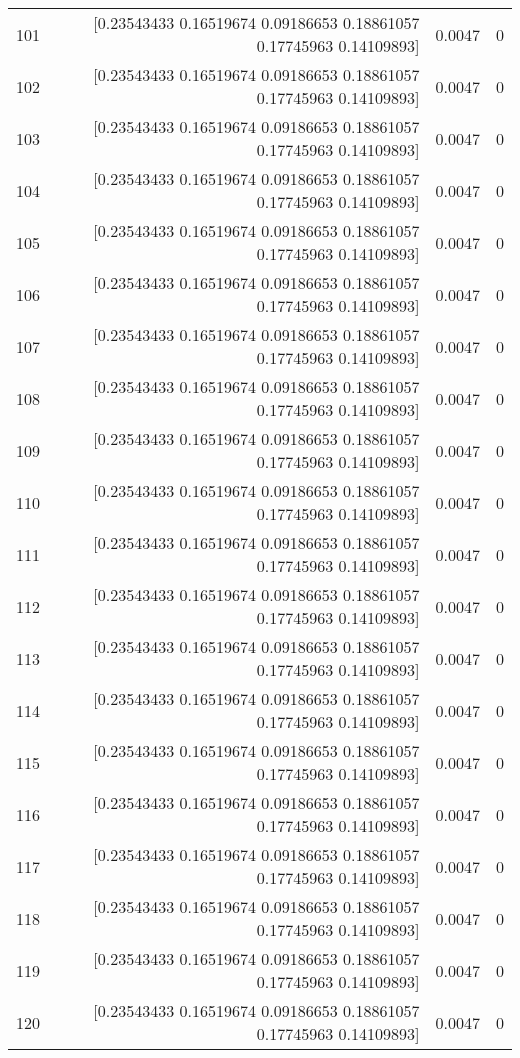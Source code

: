 \begin{longtable}{lrrr}
101 & [0.23543433 0.16519674 0.09186653 0.18861057 0.17745963 0.14109893] & 0.0047 & 0 \\
102 & [0.23543433 0.16519674 0.09186653 0.18861057 0.17745963 0.14109893] & 0.0047 & 0 \\
103 & [0.23543433 0.16519674 0.09186653 0.18861057 0.17745963 0.14109893] & 0.0047 & 0 \\
104 & [0.23543433 0.16519674 0.09186653 0.18861057 0.17745963 0.14109893] & 0.0047 & 0 \\
105 & [0.23543433 0.16519674 0.09186653 0.18861057 0.17745963 0.14109893] & 0.0047 & 0 \\
106 & [0.23543433 0.16519674 0.09186653 0.18861057 0.17745963 0.14109893] & 0.0047 & 0 \\
107 & [0.23543433 0.16519674 0.09186653 0.18861057 0.17745963 0.14109893] & 0.0047 & 0 \\
108 & [0.23543433 0.16519674 0.09186653 0.18861057 0.17745963 0.14109893] & 0.0047 & 0 \\
109 & [0.23543433 0.16519674 0.09186653 0.18861057 0.17745963 0.14109893] & 0.0047 & 0 \\
110 & [0.23543433 0.16519674 0.09186653 0.18861057 0.17745963 0.14109893] & 0.0047 & 0 \\
111 & [0.23543433 0.16519674 0.09186653 0.18861057 0.17745963 0.14109893] & 0.0047 & 0 \\
112 & [0.23543433 0.16519674 0.09186653 0.18861057 0.17745963 0.14109893] & 0.0047 & 0 \\
113 & [0.23543433 0.16519674 0.09186653 0.18861057 0.17745963 0.14109893] & 0.0047 & 0 \\
114 & [0.23543433 0.16519674 0.09186653 0.18861057 0.17745963 0.14109893] & 0.0047 & 0 \\
115 & [0.23543433 0.16519674 0.09186653 0.18861057 0.17745963 0.14109893] & 0.0047 & 0 \\
116 & [0.23543433 0.16519674 0.09186653 0.18861057 0.17745963 0.14109893] & 0.0047 & 0 \\
117 & [0.23543433 0.16519674 0.09186653 0.18861057 0.17745963 0.14109893] & 0.0047 & 0 \\
118 & [0.23543433 0.16519674 0.09186653 0.18861057 0.17745963 0.14109893] & 0.0047 & 0 \\
119 & [0.23543433 0.16519674 0.09186653 0.18861057 0.17745963 0.14109893] & 0.0047 & 0 \\
120 & [0.23543433 0.16519674 0.09186653 0.18861057 0.17745963 0.14109893] & 0.0047 & 0 \\

\end{longtable}
